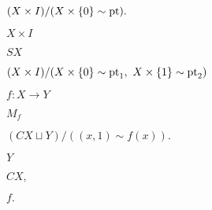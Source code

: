 \documentclass[10pt]{book}
\begin{document}
\begin{mdSnippets}
\begin{mdInlineSnippet}[756635ec7a8596680ce6012aec4185cb]
$(X \times I) / (X \times \{0\} \sim \operatorname{pt}).$\end{mdInlineSnippet}%
\begin{mdInlineSnippet}[26d34f122c7d90a3b9b52a8fe00c7c92]%
$X \times I$\end{mdInlineSnippet}%
\begin{mdInlineSnippet}%
$SX$\end{mdInlineSnippet}%
\begin{mdInlineSnippet}[867edc56cf3e14f273b0af096d63f90e]%
$(X \times I) / (X \times \{0\} \sim \operatorname{pt}_1,\ X \times \{1\} \sim \operatorname{pt}_2)$\end{mdInlineSnippet}%
\begin{mdInlineSnippet}[2385fde6b300ad088e0c2711c9da8a74]%
$f: X \to Y$\end{mdInlineSnippet}%
\begin{mdInlineSnippet}[5feade52f51b7f09e56060524e6a7bc0]%
$M_f$\end{mdInlineSnippet}%
\begin{mdInlineSnippet}[3d5af879b9a2845f2e22776311d3465c]%
$(CX \sqcup Y) / ((x,1) \sim f(x)).$\end{mdInlineSnippet}%
\begin{mdInlineSnippet}[57cec4137b614c87cb4e24a3d003a3e0]%
$Y$\end{mdInlineSnippet}%
\begin{mdInlineSnippet}[8f394246ac7b87ad5d7021366a3a1982]%
$CX,$\end{mdInlineSnippet}%
\begin{mdInlineSnippet}[e3cde3f61de01c172fa395c723c68d2f]%
$f.$\end{mdInlineSnippet}%

\end{mdSnippets}
\end{document}
